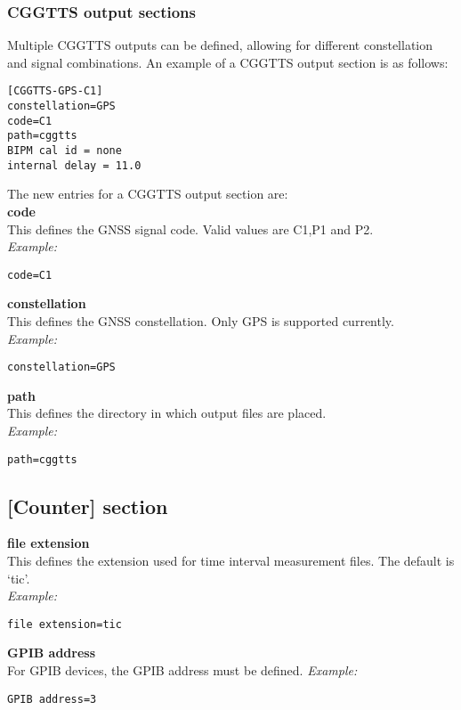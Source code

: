 \subsubsection{CGGTTS output sections}

Multiple CGGTTS outputs can be defined, allowing for different constellation and signal combinations.
An example of a CGGTTS output section is as follows:
\begin{lstlisting}
[CGGTTS-GPS-C1]
constellation=GPS
code=C1
path=cggtts
BIPM cal id = none
internal delay = 11.0
\end{lstlisting}

The new entries for a CGGTTS output section are:\\
{\bfseries code}\\
This defines the GNSS signal code. Valid values are C1,P1 and P2.\\
\textit{Example:}
\begin{lstlisting}
code=C1
\end{lstlisting}

{\bfseries constellation}\\
This defines the GNSS constellation. Only GPS is supported currently.\\
\textit{Example:}
\begin{lstlisting}
constellation=GPS
\end{lstlisting}

{\bfseries path}\\
This defines the directory in which output files are placed.\\
\textit{Example:}
\begin{lstlisting}
path=cggtts
\end{lstlisting}

\subsection{[Counter] section}

\hypertarget{h:counter}{}

{\bfseries file extension}\\
This defines the extension used for time interval measurement files.
The default is `tic'.\\
\textit{Example:}
\begin{lstlisting}
file extension=tic
\end{lstlisting}

{\bfseries GPIB address}\\
For GPIB devices, the GPIB address must be defined.
\textit{Example:}
\begin{lstlisting}
GPIB address=3
\end{lstlisting}

